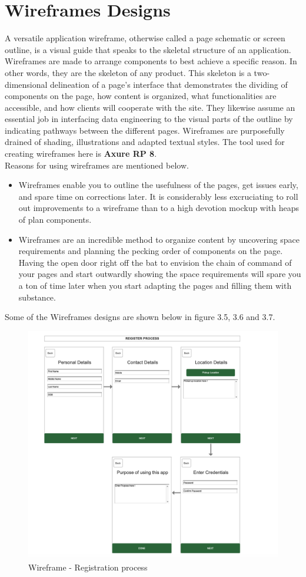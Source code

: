 \section{Wireframes Designs}

A versatile application wireframe, otherwise called a page schematic or screen outline, is a visual guide that speaks to the skeletal structure of an application. Wireframes are made to arrange components to best achieve a specific reason. In other words, they are the skeleton of any product. This skeleton is a two-dimensional delineation of a page's interface that demonstrates the dividing of components on the page, how content is organized, what functionalities are accessible, and how clients will cooperate with the site. They likewise assume an essential job in interfacing data engineering to the visual parts of the outline by indicating pathways between the different pages. Wireframes are purposefully drained of shading, illustrations and adapted textual styles. The tool used for creating wireframes here is \textbf{Axure RP 8}. \\
Reasons for using wireframes are mentioned below.

\begin{itemize}
    \item Wireframes enable you to outline the usefulness of the pages, get issues early, and spare time on corrections later. It is considerably less excruciating to roll out improvements to a wireframe than to a high devotion mockup with heaps of plan components. \\
    
    \item Wireframes are an incredible method to organize content by uncovering space requirements and planning the pecking order of components on the page. Having the open door right off the bat to envision the chain of command of your pages and start outwardly showing the space requirements will spare you a ton of time later when you start adapting the pages and filling them with substance. \\
\end{itemize}

Some of the Wireframes designs are shown below in figure 3.5, 3.6 and 3.7.

    \begin{figure}[H]
            \centering
            \includegraphics[width=0.5\linewidth]{figures/ch3/wireframe_1.png}
            \caption{\label{fig:wireframe_1} Wireframe - Registration process}
    \end{figure}
  
